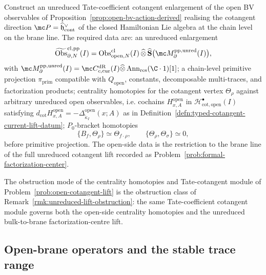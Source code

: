 \documentclass[11pt]{memoir}
\begin{document}
\begin{prob}\label{prob:open-cotangent-lift}
  Construct an unreduced Tate-coefficient cotangent enlargement of the
  open BV observables of Proposition~\ref{prop:open-bv-action-derived}
  realising the cotangent direction
  \(\mc P=\widehat{\mathfrak h}^{\vee}_{\mathrm{cont}}\) of the closed
  Hamiltonian Lie algebra at the chain level on the brane line. The
  required data are: an unreduced enlargement
  \[
    \widetilde{\mathrm{Obs}}^{\mathrm{cl,pp}}_{\partial,N}(I)
      =\mathrm{Obs}^{\mathrm{cl}}_{\mathrm{open},N}(I)
        \,\widehat\otimes\,
        \widehat{\mathbf S}\bigl(
          \mc M^{\mathrm{pp,unred}}_\partial(I)\bigr),
  \]
  with
  \(\mc M^{\mathrm{pp,unred}}_\partial(I)
    =\mc C^{\mathrm{dR}}_{c,\mathrm{cur}}(I)\widehat\otimes
      \operatorname{Ann}_{\mathrm{res}}(\C\cdot1)[1]\); a chain-level
	  primitive projection \(\pi_{\mathrm{prim}}\) compatible with
	  \(Q_{\mathrm{open}}\), constants, decomposable multi-traces, and
	  factorization products; centrality homotopies for the cotangent
	  vertex \(\Theta_\rho\) against arbitrary unreduced open observables,
	  i.e. cochains \(H^{\mathrm{open}}_{x,A}\) in
	  \(\mathcal H^\bullet_{\mathrm{cot,open}}(I)\) satisfying
	  \(d_{\mathrm{cot}}H^{\mathrm{open}}_{x,A}
	  =-\Delta^{\mathrm{open}}_{\widetilde\kappa_I}(x;A)\) as in
	  Definition~\ref{defn:typed-cotangent-current-lift-datum};
	  \(P_0\)-bracket homotopies
  \[
    \{B_f,\Theta_\rho\}\simeq\Theta_{f\cdot\rho},\qquad
    \{\Theta_\rho,\Theta_\sigma\}\simeq 0,
  \]
  before primitive projection. The open-side data is the restriction
  to the brane line of the full unreduced cotangent lift recorded as
  Problem~\ref{prob:formal-factorization-center}.
\end{prob}

The obstruction mode of the centrality homotopies and Tate-cotangent module
of Problem~\ref{prob:open-cotangent-lift} is the obstruction class of
Remark~\ref{rmk:unreduced-lift-obstruction}: the same Tate-coefficient
cotangent module governs both the open-side centrality homotopies and
the unreduced bulk-to-brane factorization-centre lift.

\subsection{\texorpdfstring{Open-brane operators and the stable trace range}{Open-brane operators and the stable trace range}}\label{ssec:open-brane-operators}
\end{document}
